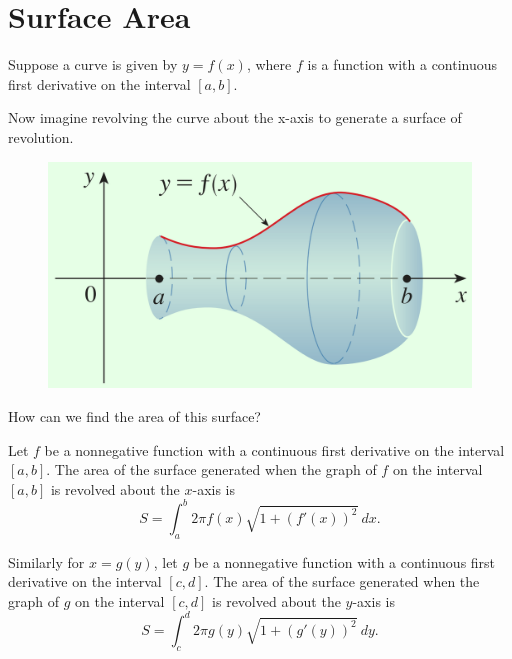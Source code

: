 \documentclass[compacto,10pt,comentarios]{aleph-notas}
\begin{document}
\encabezado

\section*{Surface Area}
Suppose a curve is given by $y = f(x)$, where $f$ is a function with a continuous first derivative
on the interval $[a, b]$.

Now imagine revolving the curve about the x-axis to generate a surface of revolution.

\begin{figure}[h!]
    \centering
        \includegraphics[width=1\linewidth]{../Images/6_6_surfacearea_01.png}
\end{figure}

How can we find the area of this surface?

\begin{defi}
    Let $f$ be a nonnegative function with a continuous first derivative on the interval
    $[a, b]$. The area of the surface generated when the graph of $f$ on the interval $[a, b]$
    is revolved about the $x$-axis is
    $$
        S = \int_{a}^{b} 2 \pi f(x) \sqrt{1 + (f'(x))^{2}} ~ dx .
    $$

    Similarly for $x = g(y)$, let $g$ be a nonnegative function with a continuous first derivative on the interval
    $[c, d]$. The area of the surface generated when the graph of $g$ on the interval $[c, d]$
    is revolved about the $y$-axis is
    $$
        S = \int_{c}^{d} 2 \pi g(y) \sqrt{1 + (g'(y))^{2}} ~ dy .
    $$
\end{defi}
\end{document}
